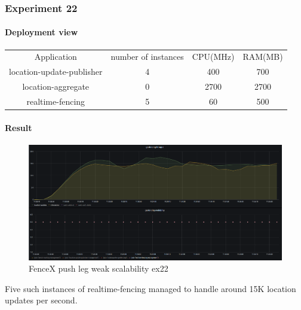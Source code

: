 \documentclass[a4]{report}
\begin{document}
        \clearpage

        \subsubsection{Experiment 22}

        \paragraph{Deployment view}
        \begin{center}
            \begin{tabular}{ c c c c }
                Application               & number of instances & CPU(MHz) & RAM(MB) \\
                location-update-publisher & 4                   & 400      & 700     \\
                location-aggregate        & 0                   & 2700     & 2700    \\
                realtime-fencing          & 5                   & 60       & 500     \\
            \end{tabular}
        \end{center}

        \paragraph{Result}
        \begin{figure}[ht]
            \caption{FenceX push leg weak scalability ex22}
            \label{fig:ex22}
            \includegraphics[scale=0.4]{images/evaluation/ex22-benchmarking-ongoing-1per2sec.png}
        \end{figure}
        Five such instances of realtime-fencing managed to handle around 15K location updates per second.

        \clearpage
\end{document}
